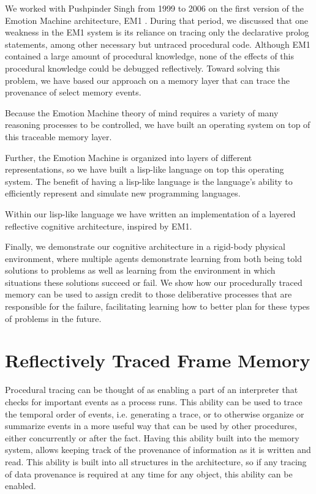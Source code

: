 We worked with Pushpinder Singh from 1999 to 2006 on the first version
of the Emotion Machine architecture, EM1 \citep{singh:2005}.  During
that period, we discussed that one weakness in the EM1 system is its
reliance on tracing only the declarative prolog statements, among
other necessary but untraced procedural code.  Although EM1 contained
a large amount of procedural knowledge, none of the effects of this
procedural knowledge could be debugged reflectively.  Toward solving
this problem, we have based our approach on a memory layer that can
trace the provenance of select memory events.

Because the Emotion Machine theory of mind requires a variety of many
reasoning processes to be controlled, we have built an operating
system on top of this traceable memory layer.

Further, the Emotion Machine is organized into layers of different
representations, so we have built a lisp-like language on top this
operating system.  The benefit of having a lisp-like language is the
language's ability to efficiently represent and simulate new
programming languages.

Within our lisp-like language we have written an implementation of a
layered reflective cognitive architecture, inspired by EM1.

Finally, we demonstrate our cognitive architecture in a rigid-body
physical environment, where multiple agents demonstrate learning from
both being told solutions to problems as well as learning from the
environment in which situations these solutions succeed or fail.  We
show how our procedurally traced memory can be used to assign credit
to those deliberative processes that are responsible for the failure,
facilitating learning how to better plan for these types of problems
in the future.

\section{Reflectively Traced Frame Memory}

Procedural tracing can be thought of as enabling a part of an
interpreter that checks for important events as a process runs.  This
ability can be used to trace the temporal order of events, i.e.
generating a trace, or to otherwise organize or summarize events in a
more useful way that can be used by other procedures, either
concurrently or after the fact.  Having this ability built into the
memory system, allows keeping track of the provenance of information as
it is written and read.  This ability is built into all structures in
the architecture, so if any tracing of data provenance is required at
any time for any object, this ability can be enabled.

